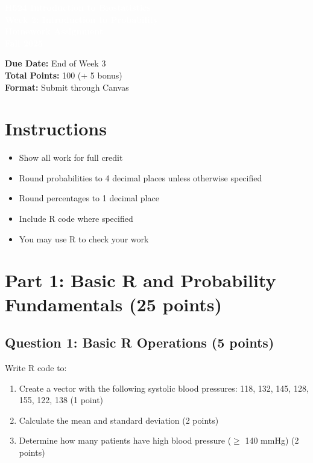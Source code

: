 \documentclass[11pt]{article}
\title{}
\author{}
\date{}
\begin{document}
\begin{tcolorbox}[colback=osaorange,colframe=black,boxrule=2pt,arc=0pt,left=3pt,right=3pt,top=6pt,bottom=6pt,boxsep=2pt]
\centering
\textcolor{white}{\textbf{\Large H524 Introduction to Biostatistics}}\\
\textcolor{white}{\textbf{\Large Week 2: Introduction to Probability}}\\
\textcolor{white}{\textbf{\Large Homework Assignment}}\\
\textcolor{white}{\textbf{\Large Fall 2025}}
\end{tcolorbox}

\vspace{8pt}

\noindent\textbf{Due Date:} End of Week 3\\
\textbf{Total Points:} 100 (+ 5 bonus)\\
\textbf{Format:} Submit through Canvas

\section*{Instructions}

\begin{itemize}
\item Show all work for full credit
\item Round probabilities to 4 decimal places unless otherwise specified
\item Round percentages to 1 decimal place
\item Include R code where specified
\item You may use R to check your work
\end{itemize}

\section{Part 1: Basic R and Probability Fundamentals (25 points)}

\subsection*{Question 1: Basic R Operations (5 points)}

Write R code to:

\begin{enumerate}[label=\alph*)]
\item Create a vector with the following systolic blood pressures: 118, 132, 145, 128, 155, 122, 138 (1 point)
\item Calculate the mean and standard deviation (2 points)
\item Determine how many patients have high blood pressure ($\geq$ 140 mmHg) (2 points)
\end{enumerate}
\end{document}
